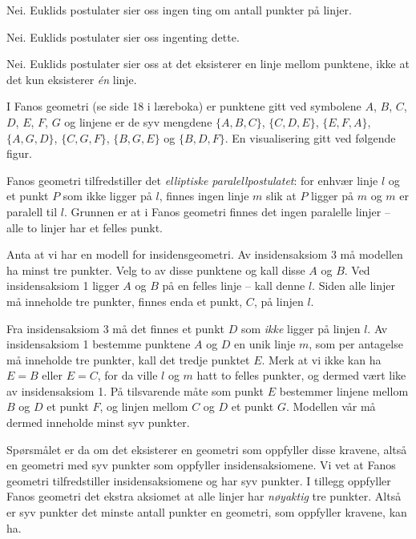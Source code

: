 \begin{oppgave}[1.6.7]

  \begin{punkt}
    Nei. Euklids postulater sier oss ingen ting om antall punkter på linjer. 
  \end{punkt}

  \begin{punkt}
    Nei. Euklids postulater sier oss ingenting dette. 
  \end{punkt}

  \begin{punkt}
    Nei. Euklids postulater sier oss at det eksisterer en linje mellom punktene, ikke at 
    det kun eksisterer \emph{én} linje. 
  \end{punkt}
\end{oppgave}

\begin{oppgave}[2.4.7]
  I Fanos geometri (se side 18 i læreboka) er punktene gitt ved symbolene $A$, $B$, 
  $C$, $D$, $E$, $F$, $G$ og linjene er de syv mengdene $\{A, B, C\}$, $\{C, D, E\}$, 
  $\{E, F, A\}$, $\{A, G, D\}$, $\{C, G, F\}$, $\{B, G, E\}$ og $\{B, D, F\}$. En 
  visualisering gitt ved følgende figur. 
  \begin{figure}[H]
    \centering
    
  \end{figure}
  Fanos geometri tilfredstiller det \emph{elliptiske paralellpostulatet}: for enhvær 
  linje $l$ og et punkt $P$ som ikke ligger på $l$, finnes ingen linje $m$ slik at 
  $P$ ligger på $m$ og $m$ er paralell til $l$. Grunnen er at i Fanos geometri finnes 
  det ingen paralelle linjer -- alle to linjer har et felles punkt. 
\end{oppgave}

\begin{oppgave}[2.4.10]
  Anta at vi har en modell for insidensgeometri. Av insidensaksiom 3 må modellen ha 
  minst tre punkter. Velg to av disse punktene og kall disse $A$ og $B$. Ved 
  insidensaksiom 1 ligger $A$ og $B$ på en felles linje -- kall denne $l$. Siden alle 
  linjer må inneholde tre punkter, finnes enda et punkt, $C$, på linjen $l$. 

  Fra insidensaksiom 3 må det finnes et punkt $D$ som \emph{ikke} ligger på linjen $l$. 
  Av insidensaksiom 1 bestemme punktene $A$ og $D$ en unik linje $m$, som per antagelse
  må inneholde tre punkter, kall det tredje punktet $E$. Merk at vi ikke kan ha $E=B$
  eller $E=C$, for da ville $l$ og $m$ hatt to felles punkter, og dermed vært like av 
  insidensaksiom 1. På tilsvarende måte som punkt $E$ bestemmer linjene mellom $B$ og 
  $D$ et punkt $F$, og linjen mellom $C$ og $D$ et punkt $G$. Modellen vår må dermed 
  inneholde minst syv punkter. 

  Spørsmålet er da om det eksisterer en geometri som oppfyller disse kravene, altså en 
  geometri med syv punkter som oppfyller insidensaksiomene. Vi vet at Fanos geometri 
  tilfredstiller insidensaksiomene og har syv punkter. I tillegg oppfyller Fanos geometri
  det ekstra aksiomet at alle linjer har \emph{nøyaktig} tre punkter. Altså er syv punkter
  det minste antall punkter en geometri, som oppfyller kravene, kan ha. 
\end{oppgave}

